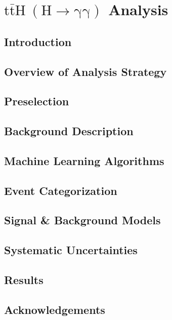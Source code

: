 \chapter{$\mathrm{t\bar{t}H~(H \to \gamma \gamma)}$ Analysis}

\section{Introduction} \label{sec:tth_intro}


\section{Overview of Analysis Strategy} \label{sec:tth_analysis_strategy}


\section{Preselection} \label{sec:tth_presel}


\section{Background Description} \label{sec:tth_background_description}


\section{Machine Learning Algorithms} \label{sec:tth_mvas}


\section{Event Categorization} \label{sec:tth_event_categorization}


\section{Signal \& Background Models} \label{sec:tth_sig_bkg_models}


\section{Systematic Uncertainties} \label{sec:tth_systematic_uncertainties}


\section{Results} \label{sec:tth_results}


\section{Acknowledgements} \label{sec:tth_ack}

